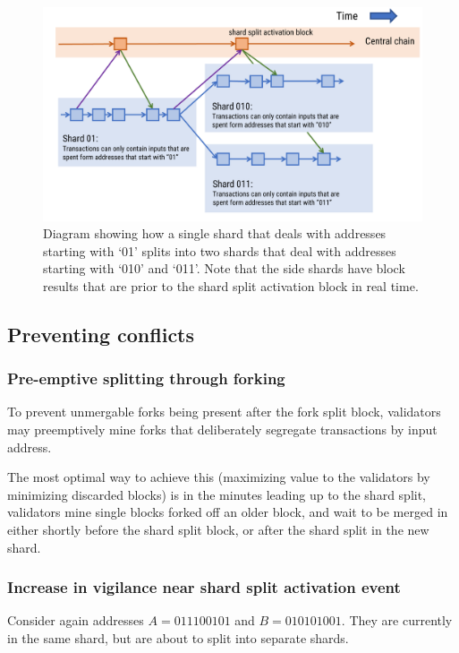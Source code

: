 \documentclass[a4paper,12pt]{article}
\begin{document}
\begin{figure}[!htb]
  \centering
  \includegraphics[page=1,width=.95\textwidth]{fork-split-diagram} 
  \caption{Diagram showing how a single shard that deals with addresses starting with `01' splits into two shards that deal with addresses starting with `010' and `011'. Note that the side shards have block results that are prior to the shard split activation block in real time.}
  \label{fig:fork-split-diagram}
\end{figure}
\FloatBarrier



\subsection{Preventing conflicts}

\subsubsection{Pre-emptive splitting through forking}
To prevent unmergable forks being present after the fork split block, validators may preemptively mine forks that deliberately segregate transactions by input address. 

The most optimal way to achieve this (maximizing value to the validators by minimizing discarded blocks) is in the minutes leading up to the shard split, validators mine single blocks forked off an older block, and wait to be merged in either shortly before the shard split block, or after the shard split in the new shard.

\subsubsection{Increase in vigilance near shard split activation event}
Consider again addresses $A=011100101$ and $B=010101001$. They are currently in the same shard, but are about to split into separate shards. 
\end{document}
